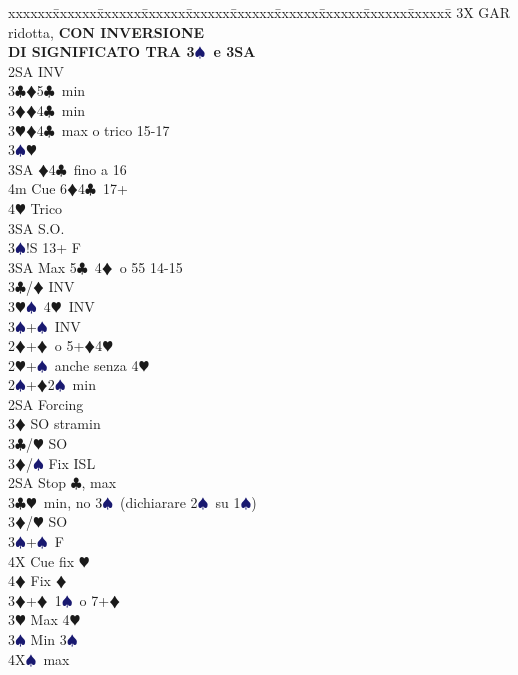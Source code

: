 \documentclass[a4paper,italian]{article}
\newcommand{\BC}{\textcolor{OliveGreen}{$\clubsuit$}}
\newcommand{\BD}{\textcolor{RedOrange}{$\vardiamondsuit$}}
\newcommand{\BH}{\textcolor{Red2}{$\varheartsuit${}}}
\newcommand{\BS}{\textcolor{MidnightBlue}{$\spadesuit${}}}
\newenvironment{bidtable}
{\begin{tabbing}

    xxxxxx\=xxxxxx\=xxxxxx\=xxxxxx\=xxxxxx\=xxxxxx\=xxxxxx\=xxxxxx\=xxxxxx\=xxxxxx\=\kill}
{\end{tabbing} }%
\begin{document}
\begin{multicols}{2}
\begin{bidtable}
        3X \> GAR ridotta, \textbf{CON INVERSIONE}\+\\
        \textbf{DI SIGNIFICATO TRA 3\BS\ e 3SA}\-\-\\
        2SA \> INV\+\\
        3\BC {}\BD 5\BC\ min\\
        3\BD {}\BD 4\BC\ min\\
        3\BH {}\BD 4\BC\ max o trico 15-17\+\\
        3\BS {}\BH \+\\
        3SA \BD 4\BC\ fino a 16\\
        4m \> Cue 6\BD 4\BC\ 17+\\
        4\BH \> Trico\-\\
        3SA \> S.O.\-\\
        3\BS {}!S 13+ F\\
        3SA \> Max 5\BC\ 4\BD\ o 55 14-15\-\\
        3\BC/\BD \> INV\\
        3\BH {}\BS\ 4\BH\ INV\\
        3\BS {}+\BS\ INV\-\\
        2\BD {}+\BD\ o 5+\BD4\BH\+\\
        2\BH {}+\BS\ anche senza 4\BH\+\\
        2\BS {}+\BD 2\BS\ min \+\\
        2SA \> Forcing \+\\
        3\BD \> SO stramin \-\\
        3\BC/\BH\> SO\\
        3\BD/\BS \> Fix ISL\-\\
        2SA \> Stop \BC, max\\
        3\BC {}\BH\ min, no 3\BS\ (dichiarare 2\BS\ su 1\BS)\+\\
        3\BD/\BH\> SO\\
        3\BS{}+\BS\ F\\
        4X\> Cue fix \BH\\
        4\BD\> Fix \BD\-\\
        3\BD{}+\BD\ 1\BS\ o 7+\BD\\
        3\BH\> Max 4\BH\\
        3\BS\> Min 3\BS\\
        4X\BS\ max\-\-\\


\end{bidtable}
\end{multicols}
\end{document}
